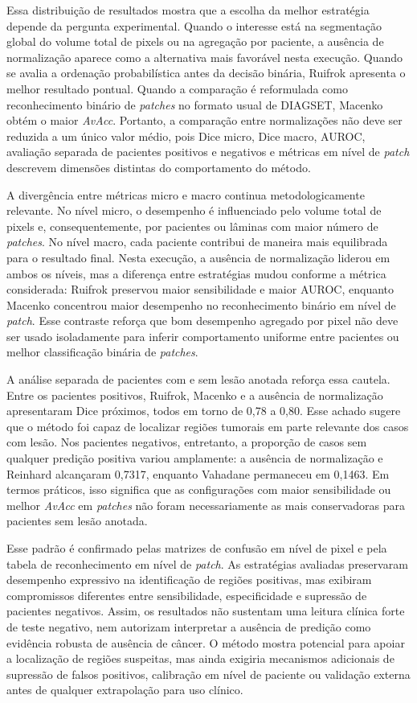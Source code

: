 Essa distribuição de resultados mostra que a escolha da melhor estratégia depende da pergunta experimental. Quando o interesse está na segmentação global do volume total de pixels ou na agregação por paciente, a ausência de normalização aparece como a alternativa mais favorável nesta execução. Quando se avalia a ordenação probabilística antes da decisão binária, Ruifrok apresenta o melhor resultado pontual. Quando a comparação é reformulada como reconhecimento binário de \textit{patches} no formato usual de DIAGSET, Macenko obtém o maior \textit{AvAcc}. Portanto, a comparação entre normalizações não deve ser reduzida a um único valor médio, pois Dice micro, Dice macro, AUROC, avaliação separada de pacientes positivos e negativos e métricas em nível de \textit{patch} descrevem dimensões distintas do comportamento do método.

A divergência entre métricas micro e macro continua metodologicamente relevante. No nível micro, o desempenho é influenciado pelo volume total de pixels e, consequentemente, por pacientes ou lâminas com maior número de \textit{patches}. No nível macro, cada paciente contribui de maneira mais equilibrada para o resultado final. Nesta execução, a ausência de normalização liderou em ambos os níveis, mas a diferença entre estratégias mudou conforme a métrica considerada: Ruifrok preservou maior sensibilidade e maior AUROC, enquanto Macenko concentrou maior desempenho no reconhecimento binário em nível de \textit{patch}. Esse contraste reforça que bom desempenho agregado por pixel não deve ser usado isoladamente para inferir comportamento uniforme entre pacientes ou melhor classificação binária de \textit{patches}.

A análise separada de pacientes com e sem lesão anotada reforça essa cautela. Entre os pacientes positivos, Ruifrok, Macenko e a ausência de normalização apresentaram Dice próximos, todos em torno de 0{,}78 a 0{,}80. Esse achado sugere que o método foi capaz de localizar regiões tumorais em parte relevante dos casos com lesão. Nos pacientes negativos, entretanto, a proporção de casos sem qualquer predição positiva variou amplamente: a ausência de normalização e Reinhard alcançaram 0{,}7317, enquanto Vahadane permaneceu em 0{,}1463. Em termos práticos, isso significa que as configurações com maior sensibilidade ou melhor \textit{AvAcc} em \textit{patches} não foram necessariamente as mais conservadoras para pacientes sem lesão anotada.

Esse padrão é confirmado pelas matrizes de confusão em nível de pixel e pela tabela de reconhecimento em nível de \textit{patch}. As estratégias avaliadas preservaram desempenho expressivo na identificação de regiões positivas, mas exibiram compromissos diferentes entre sensibilidade, especificidade e supressão de pacientes negativos. Assim, os resultados não sustentam uma leitura clínica forte de teste negativo, nem autorizam interpretar a ausência de predição como evidência robusta de ausência de câncer. O método mostra potencial para apoiar a localização de regiões suspeitas, mas ainda exigiria mecanismos adicionais de supressão de falsos positivos, calibração em nível de paciente ou validação externa antes de qualquer extrapolação para uso clínico.

